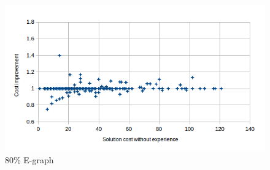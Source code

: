 \documentclass[letterpaper]{article}
\begin{document}
\begin{figure}
	\begin{center}
	\includegraphics[scale=0.5]{Cost_80_0.png}
	\end{center}
	\caption{80\% E-graph}
	 \label{fig:c_80_0}
\end{figure}
\end{document}
